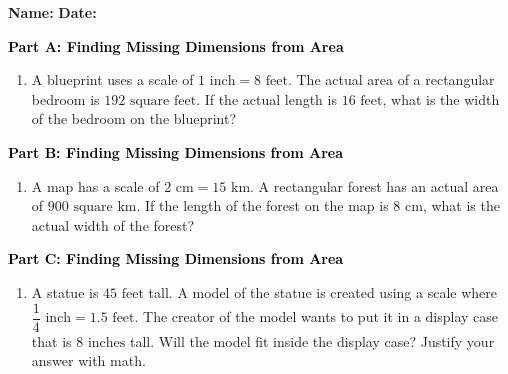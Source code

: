\documentclass[12pt, letterpaper, fleqn]{article}
\begin{document}
\textbf{Name:} \underline{\hspace{5cm}}
\hfill
\textbf{Date:} \underline{\hspace{3cm}}\\

\begin{tcolorbox}[colback=customteal!20]
\large\textcolor{black}{\textbf{Part A: Finding Missing Dimensions from Area}}
\end{tcolorbox}

\vspace{3mm}

\begin{enumerate}[itemsep=5.5cm, leftmargin=0.6cm]
\item A blueprint uses a scale of $1\text{ inch} = 8\text{ feet}$. The actual area of a rectangular bedroom is $192\text{ square feet}$. If the actual length is $16\text{ feet}$, what is the width of the bedroom on the blueprint?
\end{enumerate}

\newpage

\begin{tcolorbox}[colback=customteal!20]
\large\textcolor{black}{\textbf{Part B: Finding Missing Dimensions from Area}}
\end{tcolorbox}

\vspace{3mm}

\begin{enumerate}[itemsep=5.5cm, leftmargin=0.6cm, resume]
\item A map has a scale of $2\text{ cm} = 15\text{ km}$. A rectangular forest has an actual area of $900\text{ square km}$. If the length of the forest on the map is $8\text{ cm}$, what is the actual width of the forest?
\end{enumerate}

\newpage

\begin{tcolorbox}[colback=customteal!20]
\large\textcolor{black}{\textbf{Part C: Finding Missing Dimensions from Area}}
\end{tcolorbox}

\vspace{3mm}

\begin{enumerate}[itemsep=5.5cm, leftmargin=0.6cm, resume]
\item A statue is $45\text{ feet}$ tall. A model of the statue is created using a scale where $\dfrac{1}{4}\text{ inch} = 1.5\text{ feet}$. The creator of the model wants to put it in a display case that is $8\text{ inches}$ tall. Will the model fit inside the display case? Justify your answer with math.
\end{enumerate}
\end{document}
